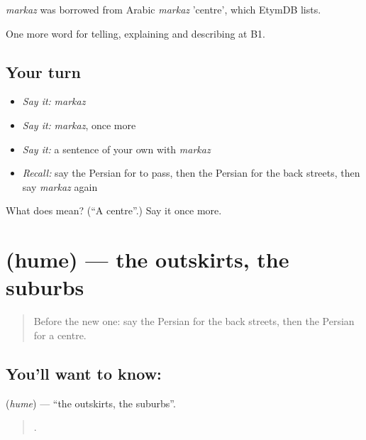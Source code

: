 \begin{cousinweb}
\emph{markaz} was borrowed from Arabic \emph{markaz} 'centre', which EtymDB lists.
\end{cousinweb}

\begin{grammarlens}[title={What you've built}]
One more word for telling, explaining and describing at B1.
\end{grammarlens}

\subsection*{Your turn}
\begin{itemize}
\raggedright
  \item \emph{Say it:} \emph{markaz}
  \item \emph{Say it:} \emph{markaz}, once more
  \item \emph{Say it:} a sentence of your own with \emph{markaz}
  \item \emph{Recall:} say the Persian for to pass, then the Persian for the back streets, then say \emph{markaz} again
\end{itemize}

\begin{tcolorbox}[breakable,colback=teal!4,colframe=teal!35!black,title={Before you move on}]
What does  mean? (\textquotedblleft{}A centre\textquotedblright{}.) Say it once more.
\end{tcolorbox}
\section[\texorpdfstring{\fa{حومه} (hume)}{حومه (hume)}]{ (hume) — the outskirts, the suburbs}

\label{lesson:FA-C450-hume}



\begin{quote}
Before the new one: say the Persian for the back streets, then the Persian for a centre.
\end{quote}

\subsection*{You'll want to know: }
\textbf{} (\emph{hume}) — \textquotedblleft{}the outskirts, the suburbs\textquotedblright{}.

\begin{quote}
      .
\end{quote}

